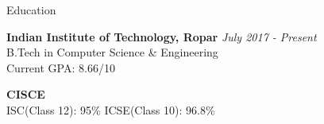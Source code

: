 \documentclass{resume2} %
\begin{document}

\begin{rSection}{Education}

{\bf Indian Institute of Technology, Ropar} \hfill {\em July 2017 - Present} \\ 
B.Tech in Computer Science \& Engineering \\
Current GPA: 8.66/10

{\bf CISCE}\\ 
ISC(Class 12): 95\% \hspace{4.6cm} ICSE(Class 10): 96.8\%
\end{rSection}
\end{document}
